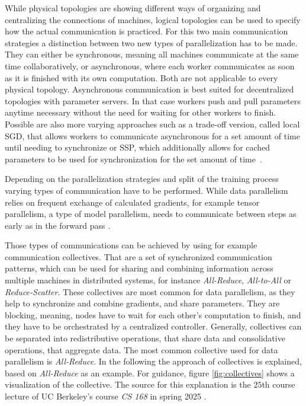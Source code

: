 While physical topologies are showing different ways of organizing and centralizing the connections of machines, logical topologies can be used to specify how the actual communication is practiced.  
For this two main communication strategies a distinction between two new types of parallelization has to be made. They can either be synchronous, meaning all machines communicate at the same time collaboratively, or asynchronous, where each worker communicates as soon as it is finished with its own computation. Both are not applicable to every physical topology. Asynchronous communication is best suited for decentralized topologies with parameter servers. In that case workers push and pull parameters anytime necessary without the need for waiting for other workers to finish.
Possible are also more varying approaches such as a trade-off version, called local \ac{SGD}, that allows workers to communicate asynchronous for a set amount of time until needing to synchronize \cite{verbraeken_survey_2020} or \ac{SSP}, which additionally allows for cached parameters to be used for synchronization for the set amount of time~\cite{tang_communication-efficient_2023}. 

Depending on the parallelization strategies and split of the training process varying types of communication have to be performed. 
While data parallelism relies on frequent exchange of calculated gradients, for example tensor parallelism, a type of model parallelism, needs to communicate between steps as early as in the forward pass \cite{dong_towards_2024}. %

Those types of communications can be achieved by using for example communication collectives. That are a set of synchronized communication patterns, which can be used for sharing and combining information across multiple machines in distributed systems, for instance \textit{All-Reduce}, \textit{All-to-All} or \textit{Reduce-Scatter}. 
These collectives are most common for data parallelism, as they help to synchronize and combine gradients, and share parameters. They are blocking, meaning, nodes have to wait for each other's computation to finish, and they have to be orchestrated by a centralized controller.
Generally, collectives can be separated into redistributive operations, that share data and consolidative operations, that aggregate data. 
The most common collective used for data parallelism is \textit{All-Reduce}. In the following the approach of collectives is explained, based on \textit{All-Reduce} as an example. For guidance, figure \ref{fig:collectives} shows a visualization of the collective.
The source for this explanation is the $25$th course lecture of UC Berkeley's course \textit{CS 168} in spring 2025 \cite{ratnasamy_collective_2025}.

